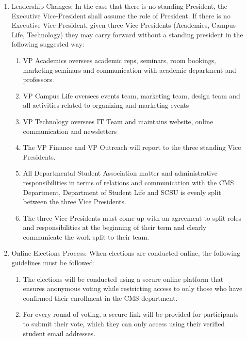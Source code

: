 \documentclass[12pt,a4paper]{article}
\begin{document}
\begin{enumerate}
\item Leadership Changes: In the case that there is no standing President, the Executive Vice-President shall assume the role of President. If there is no Executive Vice-President, given three Vice Presidents (Academics, Campus Life, Technology) they may carry forward without a standing president in the following suggested way:

\begin{enumerate}
\item VP Academics oversees academic reps, seminars, room bookings, marketing seminars and communication with academic department and professors.

\item VP Campus Life oversees events team, marketing team, design team and all activities related to organizing and marketing events

\item VP Technology oversees IT Team and maintains website, online communication and newsletters

\item The VP Finance and VP Outreach will report to the three standing Vice Presidents.

\item All Departmental Student Association matter and administrative responsibilities in terms of relations and communication with the CMS Department, Department of Student Life and SCSU is evenly split between the three Vice Presidents.

\item The three Vice Presidents must come up with an agreement to split roles and responsibilities at the beginning of their term and clearly communicate the work split to their team.
\end{enumerate}

\item Online Elections Process: When elections are conducted online, the following guidelines must be followed:

\begin{enumerate}
\item The elections will be conducted using a secure online platform that ensures anonymous voting while restricting access to only those who have confirmed their enrollment in the CMS department.

\item For every round of voting, a secure link will be provided for participants to submit their vote, which they can only access using their verified student email addresses.


\end{enumerate}
\end{enumerate}
\end{document}

